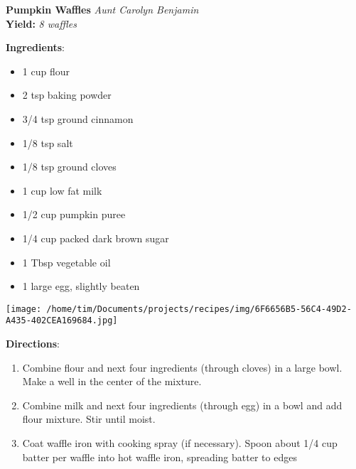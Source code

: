 \documentclass[11pt, twoside, openany]{book}
\begin{document}
\noindent\begin{minipage}[t]{\linewidth}%
{\Large\textbf{Pumpkin Waffles}} \label{pumpkin-waffles}\hfill\textit{Aunt Carolyn Benjamin}\\
\textbf{Yield:} \textit{8 waffles}\\
\noindent\begin{minipage}[t]{0.78\linewidth}%
\textbf{Ingredients}:\vspace{-3mm}
\begin{multicols}{2}
\begin{itemize}\setlength\itemsep{-1mm}
\item 1 cup flour
\item 2 tsp baking powder
\item 3/4 tsp ground cinnamon
\item 1/8 tsp salt
\item 1/8 tsp ground cloves
\item 1 cup low fat milk
\item 1/2 cup pumpkin puree
\item 1/4 cup packed dark brown sugar
\item 1 Tbsp vegetable oil
\item 1 large egg, slightly beaten
\end{itemize}
\end{multicols}
\end{minipage}
\noindent\begin{minipage}[t]{0.18\linewidth}
\centering \strut\vspace*{-\baselineskip}\newline
\texttt{[image: /home/tim/Documents/projects/recipes/img/6F6656B5-56C4-49D2-A435-402CEA169684.jpg]}\\
\end{minipage}\vspace{3mm}
\textbf{Directions}:
\vspace{-3mm}\begin{enumerate}\setlength\itemsep{-1mm}
\item Combine flour and next four ingredients (through cloves) in a large bowl. Make a well in the center of the mixture.
\item Combine milk and next four ingredients (through egg) in a bowl and add flour mixture. Stir until moist.
\item Coat waffle iron with cooking spray (if necessary). Spoon about 1/4 cup batter per waffle into hot waffle iron, spreading batter to edges
\end{enumerate}
\end{minipage}\vspace{8mm}
\end{document}
